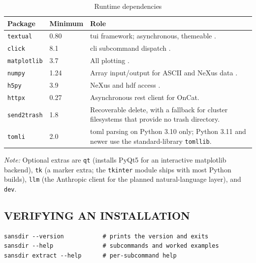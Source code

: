 \documentclass[tm]{ornltm}
\begin{document}
\begin{table}[ht]
  \centering
  \begin{threeparttable}
  \caption{Runtime dependencies}
  \label{tab:deps}
  \small
  \begin{tabular}{l l p{}}
    \toprule
    Package & Minimum & Role \\
    \midrule
    \texttt{textual}    & 0.80  & \Ac{tui} framework; asynchronous, themeable
      \autocite{textual}. \\
    \texttt{click}      & 8.1   & \Ac{cli} subcommand dispatch
      \autocite{click}. \\
    \texttt{matplotlib} & 3.7   & All plotting \autocite{matplotlib}. \\
    \texttt{numpy}      & 1.24  & Array input/output for ASCII and NeXus data
      \autocite{numpy}. \\
    \texttt{h5py}       & 3.9   & NeXus and \ac{hdf} access \autocite{h5py}. \\
    \texttt{httpx}      & 0.27  & Asynchronous \ac{rest} client for OnCat. \\
    \texttt{send2trash} & 1.8   & Recoverable delete, with a fallback for
      cluster filesystems that provide no trash directory. \\
    \texttt{tomli}      & 2.0   & \Ac{toml} parsing on Python 3.10 only;
      Python 3.11 and newer use the standard-library \texttt{tomllib}. \\
    \bottomrule
  \end{tabular}
  \begin{tablenotes}
    \item \emph{Note:} Optional extras are \texttt{qt} (installs PyQt5 for an
    interactive matplotlib backend), \texttt{tk} (a marker extra; the
    \texttt{tkinter} module ships with most Python builds), \texttt{llm} (the
    Anthropic client for the planned natural-language layer), and \texttt{dev}.
  \end{tablenotes}
  \end{threeparttable}
\end{table}

\subsection{VERIFYING AN INSTALLATION}

\begin{lstlisting}[language=shellsession]
sansdir --version           # prints the version and exits
sansdir --help              # subcommands and worked examples
sansdir extract --help      # per-subcommand help
\end{lstlisting}
\end{document}
